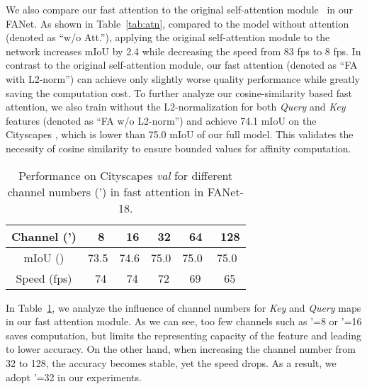 We also compare our fast attention to the original self-attention module~\cite{vaswani17att} in our FANet. 
As shown in Table~\ref{tab:atn}, compared to the model without attention (denoted as ``w/o Att.''), applying the original self-attention module to the network increases mIoU by 2.4 while decreasing the speed from 83 fps to 8 fps.
In contrast to the original self-attention module, our fast attention (denoted as ``FA with L2-norm'') can achieve only slightly worse quality performance while greatly saving the computation cost.
To further analyze our cosine-similarity based fast attention, we also train without the L2-normalization for both \textit{Query} and \textit{Key} features (denoted as ``FA w/o L2-norm'') and achieve 74.1 mIoU on the Cityscapes , which is lower than 75.0  mIoU of our full model. 
This validates the necessity of cosine similarity to ensure bounded values for affinity computation.

 \begin{table}[t!]
\centering
\small
\begin{tabular}{cccccc} 
\toprule
  Channel (')    &~8  &~16  &~32  &~64  &~128\\ 
 \midrule 
 mIoU () &73.5 &74.6 &75.0 &75.0 &75.0\\ 
 Speed (fps) &~74 &~74 &~72 &~69 &~65\\ 
\bottomrule
\end{tabular}
\vspace{-0.2cm}
\caption{\footnotesize{Performance on Cityscapes \textit{val} for different channel numbers (') in fast attention in FANet-18.}}
\vspace{-0.4cm}
\label{tab:chn}
\end{table}

In Table~\ref{tab:chn}, we analyze the influence of channel numbers for \textit{Key} and \textit{Query} maps in our fast attention module. 
As we can see, too few channels such as '=8 or '=16 saves computation, but limits the representing capacity of the feature and leading to lower accuracy. On the other hand, when increasing the channel number from 32 to 128, the accuracy becomes stable, yet the speed drops. 
As a result, we adopt '=32 in our experiments. 

